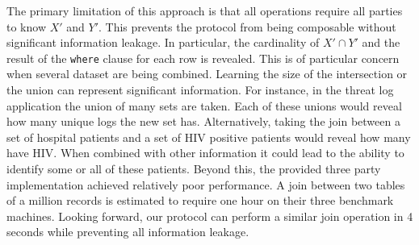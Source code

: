 The primary limitation of this approach is that all operations require all parties to know $X'$ and $Y'$. This prevents the protocol from being composable without significant information leakage. In particular, the cardinality of $X'\cap Y'$ and the result of the \texttt{where} clause for each row is revealed. This is of particular concern when several dataset are being combined. Learning the size of the intersection or the union can represent significant information. For instance, in the threat log application the union of many sets are taken. Each of these unions would reveal how many unique logs the new set has. Alternatively, taking the join between a set of hospital patients and a set of HIV positive patients would reveal how many have HIV. When combined with other information it could lead to the ability to identify some or all of these patients. Beyond this, the provided three party implementation achieved relatively poor performance. A join between two tables of a million records is estimated to require one hour on their three benchmark machines\cite{LTW13}. Looking forward, our protocol can perform a similar join operation in 4 seconds while preventing all information leakage. 


